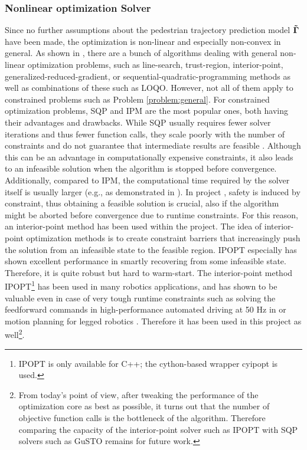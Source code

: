 \subsubsection{Nonlinear optimization Solver} 
Since no further assumptions about the pedestrian trajectory prediction model $\distmodel[]$ have been made, the optimization is non-linear and especially non-convex in general. As shown in \cite{Gould2003}\cite{Parkinson2018}\cite{Freund2004}, there are a bunch of algorithms dealing with general non-linear optimization problems, such as line-search, trust-region, interior-point, generalized-reduced-gradient, or sequential-quadratic-programming methods as well as combinations of these such as LOQO. However, not all of them apply to constrained problems such as Problem \ref{problem:general}. For constrained optimization problems, \ac{SQP} and \ac{IPM} are the most popular ones, both having their advantages and drawbacks. While \ac{SQP} usually requires fewer solver iterations and thus fewer function calls, they scale poorly with the number of constraints and do not guarantee that intermediate results are feasible \cite{Dehdari2013}\cite{Parkinson2018}. Although this can be an advantage in computationally expensive constraints, it also leads to an infeasible solution when the algorithm is stopped before convergence. Additionally, compared to \ac{IPM}, the computational time required by the solver itself is usually larger (e.g., as demonstrated in \cite{Dehdari2013}).
\newline
In project \project, safety is induced by constraint, thus obtaining a feasible solution is crucial, also if the algorithm might be aborted before convergence due to runtime constraints. For this reason, an interior-point method has been used within the project. The idea of interior-point optimization methods is to create constraint barriers that increasingly push the solution from an infeasible state to the feasible region. IPOPT especially has shown excellent performance in smartly recovering from some infeasible state.  Therefore, it is quite robust but hard to warm-start. 
\newline
The interior-point method \ac{IPOPT}\footnote{\ac{IPOPT} is only available for C++; the cython-based wrapper cyipopt is used.} \cite{Wachter2006} has been used in many robotics applications, and has shown to be valuable even in case of very tough runtime constraints such as solving the feedforward commands in high-performance automated driving at 50 Hz in \cite{Spielberg2019} or motion planning for legged robotics \cite{Winkler2018}. Therefore it has been used in this project as well\footnote{From today's point of view, after tweaking the performance of the optimization core as best as possible, it turns out that the number of objective function calls is the bottleneck of the algorithm. Therefore comparing the capacity of the interior-point solver such as \ac{IPOPT} with \ac{SQP} solvers such as \ac{GuSTO} remains for future work.}.

